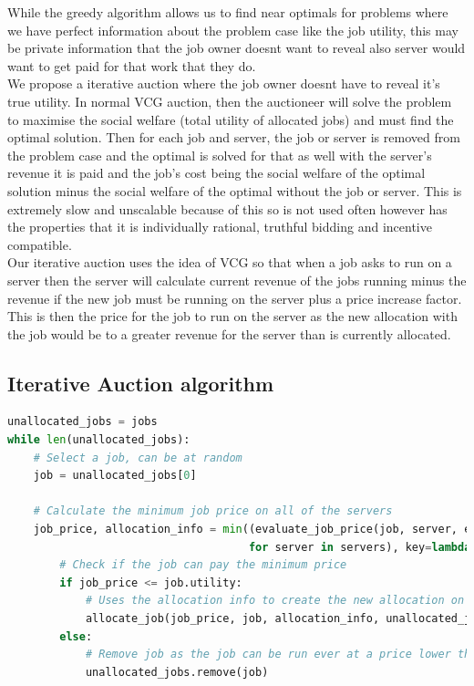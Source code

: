 While the greedy algorithm allows us to find near optimals for problems where we have perfect information about the
problem case like the job utility, this may be private information that the job owner doesnt want to reveal also
server would want to get paid for that work that they do. \\
We propose a iterative auction where the job owner doesnt have to reveal it's true utility. In normal VCG auction,
then the auctioneer will solve the problem to maximise the social welfare (total utility of allocated jobs) and must find the optimal solution.
Then for each job and server, the job or server is removed from the problem case and the optimal is solved for that as well
with the server's revenue it is paid and the job's cost being the social welfare of the optimal solution minus the
social welfare of the optimal without the job or server. This is extremely slow and unscalable because of this so is not
used often however has the properties that it is individually rational, truthful bidding and incentive compatible. \\
Our iterative auction uses the idea of VCG so that when a job asks to run on a server then the server will calculate
current revenue of the jobs running minus the revenue if the new job must be running on the server plus a price increase
factor. This is then the price for the job to run on the server as the new allocation with the job would be to a greater
revenue for the server than is currently allocated.

\subsection{Iterative Auction algorithm}\label{subsec:iterative-auction-algorithm}
\begin{lstlisting}[language=Python]
unallocated_jobs = jobs
while len(unallocated_jobs):
    # Select a job, can be at random
    job = unallocated_jobs[0]

    # Calculate the minimum job price on all of the servers
    job_price, allocation_info = min((evaluate_job_price(job, server, epsilon=epsilon)
                                     for server in servers), key=lambda bid: bid[0])
        # Check if the job can pay the minimum price
        if job_price <= job.utility:
            # Uses the allocation info to create the new allocation on the selected server
            allocate_job(job_price, job, allocation_info, unallocated_jobs)
        else:
            # Remove job as the job can be run ever at a price lower than the job's true utility
            unallocated_jobs.remove(job)
\end{lstlisting}

